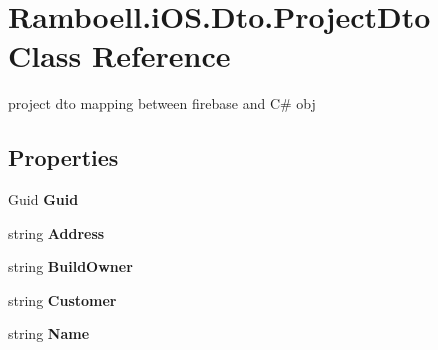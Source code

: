 \hypertarget{class_ramboell_1_1i_o_s_1_1_dto_1_1_project_dto}{}\section{Ramboell.\+i\+O\+S.\+Dto.\+Project\+Dto Class Reference}
\label{class_ramboell_1_1i_o_s_1_1_dto_1_1_project_dto}


project dto mapping between firebase and C\# obj  


\subsection*{Properties}
\begin{DoxyCompactItemize}
\item 
\mbox{\label{class_ramboell_1_1i_o_s_1_1_dto_1_1_project_dto_afd522a4e39bbb608fe22f93f65d18307}} 
Guid {\bfseries Guid}
\item 
\mbox{\label{class_ramboell_1_1i_o_s_1_1_dto_1_1_project_dto_a8dd7d60c1c5b79e54a9af0e8dac3bba1}} 
string {\bfseries Address}
\item 
\mbox{\label{class_ramboell_1_1i_o_s_1_1_dto_1_1_project_dto_aecffa5f0cbdd250869827856cae62f4c}} 
string {\bfseries Build\+Owner}
\item 
\mbox{\label{class_ramboell_1_1i_o_s_1_1_dto_1_1_project_dto_a293d4659c83142e5256d7736d4a805c5}} 
string {\bfseries Customer}
\item 
\mbox{\label{class_ramboell_1_1i_o_s_1_1_dto_1_1_project_dto_aefefac0b760dff9d440389ccdcc23c1d}} 
string {\bfseries Name}

\end{DoxyCompactItemize}
